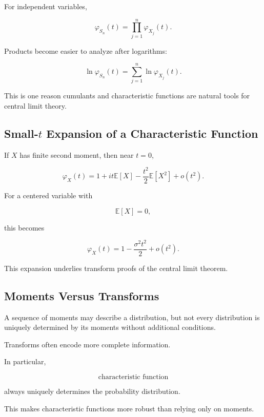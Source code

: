 For independent variables,

\[
\varphi_{S_n}(t)
=
\prod_{j=1}^{n}
\varphi_{X_j}(t).
\]

Products become easier to analyze after logarithms:

\[
\ln\varphi_{S_n}(t)
=
\sum_{j=1}^{n}
\ln\varphi_{X_j}(t).
\]

This is one reason cumulants and characteristic functions are natural
tools for central limit theory.

\subsection{Small-\(t\) Expansion of a Characteristic Function}
\label{subsec:small-t-characteristic-expansion}

If \(X\) has finite second moment, then near \(t=0\),

\[
\varphi_X(t)
=
1
+
it\mathbb{E}[X]
-
\frac{t^2}{2}
\mathbb{E}[X^2]
+
o(t^2).
\]

For a centered variable with

\[
\mathbb{E}[X]=0,
\]

this becomes

\[
\boxed{
\varphi_X(t)
=
1
-
\frac{\sigma^2t^2}{2}
+
o(t^2).
}
\]

This expansion underlies transform proofs of the central limit theorem.

\subsection{Moments Versus Transforms}
\label{subsec:moments-versus-transforms}

A sequence of moments may describe a distribution, but not every
distribution is uniquely determined by its moments without additional
conditions.

Transforms often encode more complete information.

In particular,

\[
\boxed{
\text{characteristic function}
}
\]

always uniquely determines the probability distribution.

This makes characteristic functions more robust than relying only on
moments.

